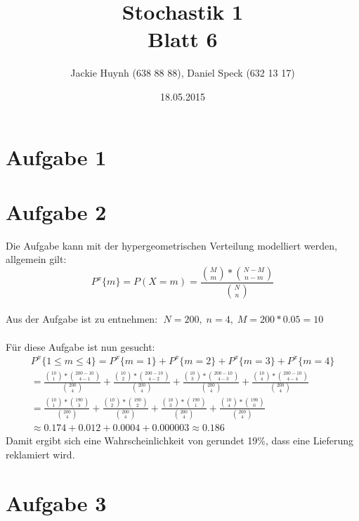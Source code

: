 \documentclass[10pt,a4paper]{article}
\title{\textbf{\huge Stochastik 1
\\\large Blatt 6}}
\author{Jackie Huynh (638 88 88), Daniel Speck (632 13 17)}
\date{18.05.2015}
\begin{document}
	\maketitle



	\section*{Aufgabe 1}
	
	\newpage
		
	\section*{Aufgabe 2}
	
		Die Aufgabe kann mit der hypergeometrischen Verteilung modelliert werden, allgemein gilt:
		\begin{equation*}
			P^x\{m\} = P(X=m)
			= \frac{\binom{M}{m} * \binom{N - M}{n - m}}{\binom{N}{n}}
		\end{equation*}
		\\
		Aus der Aufgabe ist zu entnehmen: $\; N = 200,\; n = 4,\; M = 200 * 0.05 = 10$
		\\
		\\
		Für diese Aufgabe ist nun gesucht:
		\begin{gather*}
			P^x\{1 \le m \le 4 \}
			= P^x\{m = 1\} + P^x\{m = 2\} + P^x\{m = 3\} + P^x\{m = 4\}
			\\
			=
			\frac{\binom{10}{1} * \binom{200 - 10}{4 - 1}}{\binom{200}{4}}
			+
			\frac{\binom{10}{2} * \binom{200 - 10}{4 - 2}}{\binom{200}{4}}
			+
			\frac{\binom{10}{3} * \binom{200 - 10}{4 - 3}}{\binom{200}{4}}
			+
			\frac{\binom{10}{4} * \binom{200 - 10}{4 - 4}}{\binom{200}{4}}
			\\
			=
			\frac{\binom{10}{1} * \binom{190}{3}}{\binom{200}{4}}
			+
			\frac{\binom{10}{2} * \binom{190}{2}}{\binom{200}{4}}
			+
			\frac{\binom{10}{3} * \binom{190}{1}}{\binom{200}{4}}
			+
			\frac{\binom{10}{4} * \binom{190}{0}}{\binom{200}{4}}	
			\\
			\approx
			0.174 + 0.012 + 0.0004 + 0.000003
			\approx
			0.186
		\end{gather*}
		Damit ergibt sich eine Wahrscheinlichkeit von gerundet 19\%, dass eine Lieferung reklamiert wird.
	
	\newpage
	
	\section*{Aufgabe 3}
	
\end{document}
